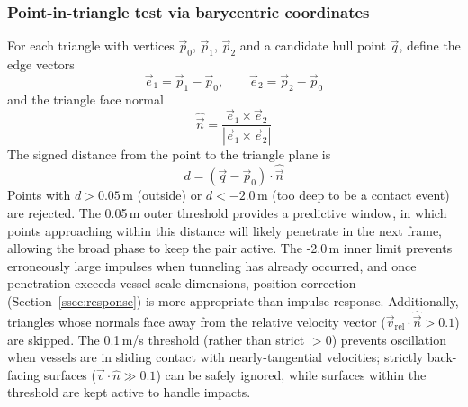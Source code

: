\documentclass[Orbiter Technical Reference.tex]{subfiles}
\begin{document}
\subsubsection{Point-in-triangle test via barycentric coordinates}
\label{sssec:barycentric}
For each triangle with vertices $\vec{p}_0$, $\vec{p}_1$, $\vec{p}_2$
and a candidate hull point $\vec{q}$, define the edge vectors
\begin{equation*}
\vec{e}_1 = \vec{p}_1 - \vec{p}_0, \qquad
\vec{e}_2 = \vec{p}_2 - \vec{p}_0
\end{equation*}
and the triangle face normal
\begin{equation*}
\hat{\vec{n}} = \frac{\vec{e}_1 \times \vec{e}_2}{|\vec{e}_1 \times \vec{e}_2|}
\end{equation*}
The signed distance from the point to the triangle plane is
\begin{equation}
d = (\vec{q} - \vec{p}_0) \cdot \hat{\vec{n}}
\label{eq:signed_dist}
\end{equation}
Points with $d > 0.05\,\text{m}$ (outside) or $d < -2.0\,\text{m}$
(too deep to be a contact event) are rejected. The 0.05\,m outer 
threshold provides a predictive window, in which points approaching within this
distance will likely penetrate in the next frame, allowing the broad 
phase to keep the pair active. The -2.0\,m inner limit prevents 
erroneously large impulses when tunneling has already occurred, and once
penetration exceeds vessel-scale dimensions, position correction
(Section~\ref{ssec:response}) is more appropriate than impulse response.
Additionally, triangles whose normals face away from the relative velocity
vector ($\vec{v}_{\mathrm{rel}} \cdot \hat{\vec{n}} > 0.1$) are skipped.
The 0.1\,m/s threshold (rather than strict $> 0$) prevents oscillation
when vessels are in sliding contact with nearly-tangential velocities;
strictly back-facing surfaces ($\vec{v} \cdot \hat{n} \gg 0.1$) can be
safely ignored, while surfaces within the threshold are kept active to
handle impacts.
\end{document}
